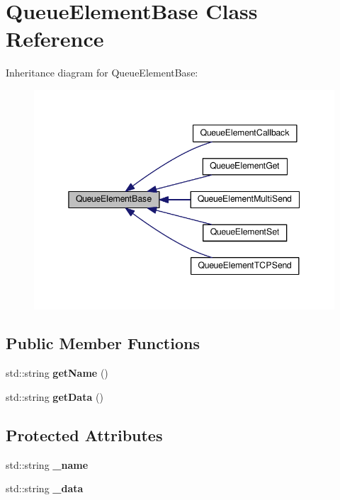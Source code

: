 \hypertarget{classQueueElementBase}{}\section{Queue\+Element\+Base Class Reference}
\label{classQueueElementBase}


Inheritance diagram for Queue\+Element\+Base\+:\nopagebreak
\begin{figure}[H]
\begin{center}
\leavevmode
\includegraphics[width=345pt]{classQueueElementBase__inherit__graph}
\end{center}
\end{figure}
\subsection*{Public Member Functions}
\begin{DoxyCompactItemize}
\item 
std\+::string {\bfseries get\+Name} ()\hypertarget{classQueueElementBase_a9c70e7d666436bfeffc430a5346e19a4}{}\label{classQueueElementBase_a9c70e7d666436bfeffc430a5346e19a4}

\item 
std\+::string {\bfseries get\+Data} ()\hypertarget{classQueueElementBase_a10026078f5ea51ffeee0c0de4b0f27c4}{}\label{classQueueElementBase_a10026078f5ea51ffeee0c0de4b0f27c4}

\end{DoxyCompactItemize}
\subsection*{Protected Attributes}
\begin{DoxyCompactItemize}
\item 
std\+::string {\bfseries \+\_\+name}\hypertarget{classQueueElementBase_a0d3714c99af515977f595be0f643d41a}{}\label{classQueueElementBase_a0d3714c99af515977f595be0f643d41a}

\item 
std\+::string {\bfseries \+\_\+data}\hypertarget{classQueueElementBase_a7cb39ad6820aadc40656013e48955833}{}\label{classQueueElementBase_a7cb39ad6820aadc40656013e48955833}

\end{DoxyCompactItemize}


